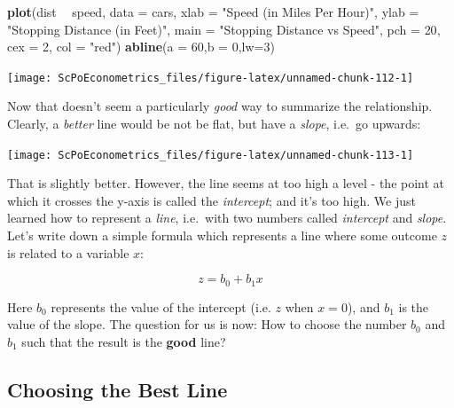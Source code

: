 \documentclass[]{book}
\newenvironment{Shaded}{\begin{snugshade}}{\end{snugshade}}
\newcommand{\DataTypeTok}[1]{\textcolor[rgb]{0.13,0.29,0.53}{#1}}
\newcommand{\DecValTok}[1]{\textcolor[rgb]{0.00,0.00,0.81}{#1}}
\newcommand{\KeywordTok}[1]{\textcolor[rgb]{0.13,0.29,0.53}{\textbf{#1}}}
\newcommand{\NormalTok}[1]{#1}
\newcommand{\OperatorTok}[1]{\textcolor[rgb]{0.81,0.36,0.00}{\textbf{#1}}}
\newcommand{\StringTok}[1]{\textcolor[rgb]{0.31,0.60,0.02}{#1}}
\begin{document}
\begin{Shaded}
\begin{Highlighting}[]
\KeywordTok{plot}\NormalTok{(dist }\OperatorTok{~}\StringTok{ }\NormalTok{speed, }\DataTypeTok{data =}\NormalTok{ cars,}
     \DataTypeTok{xlab =} \StringTok{"Speed (in Miles Per Hour)"}\NormalTok{,}
     \DataTypeTok{ylab =} \StringTok{"Stopping Distance (in Feet)"}\NormalTok{,}
     \DataTypeTok{main =} \StringTok{"Stopping Distance vs Speed"}\NormalTok{,}
     \DataTypeTok{pch  =} \DecValTok{20}\NormalTok{,}
     \DataTypeTok{cex  =} \DecValTok{2}\NormalTok{,}
     \DataTypeTok{col  =} \StringTok{"red"}\NormalTok{)}
\KeywordTok{abline}\NormalTok{(}\DataTypeTok{a =} \DecValTok{60}\NormalTok{,}\DataTypeTok{b =} \DecValTok{0}\NormalTok{,}\DataTypeTok{lw=}\DecValTok{3}\NormalTok{)}
\end{Highlighting}
\end{Shaded}

\begin{center}\texttt{[image: ScPoEconometrics\_files/figure-latex/unnamed-chunk-112-1]} \end{center}

Now that doesn't seem a particularly \emph{good} way to summarize the relationship. Clearly, a \emph{better} line would be not be flat, but have a \emph{slope}, i.e.~go upwards:

\begin{center}\texttt{[image: ScPoEconometrics\_files/figure-latex/unnamed-chunk-113-1]} \end{center}

That is slightly better. However, the line seems at too high a level - the point at which it crosses the y-axis is called the \emph{intercept}; and it's too high. We just learned how to represent a \emph{line}, i.e.~with two numbers called \emph{intercept} and \emph{slope}. Let's write down a simple formula which represents a line where some outcome \(z\) is related to a variable \(x\):

\begin{equation}
z = b_0 + b_1 x \label{eq:bline}
\end{equation}

Here \(b_0\) represents the value of the intercept (i.e. \(z\) when \(x=0\)), and \(b_1\) is the value of the slope. The question for us is now: How to choose the number \(b_0\) and \(b_1\) such that the result is the \textbf{good} line?

\hypertarget{choosing-the-best-line}{%
\subsection{Choosing the Best Line}\label{choosing-the-best-line}}
\end{document}
